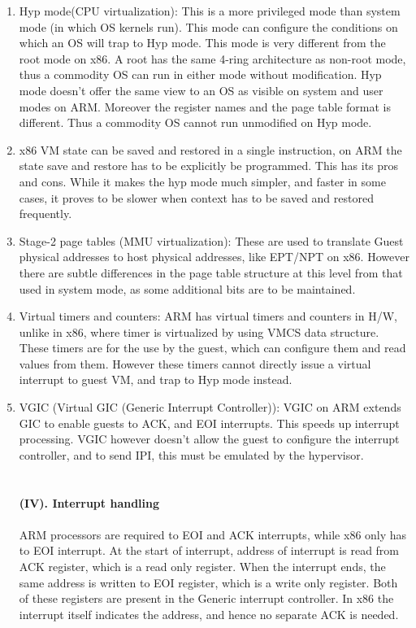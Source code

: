\documentclass[seminar,twoside]{iitbreport}
\begin{document}
\begin{enumerate}
\item Hyp mode(CPU virtualization): This is a more privileged mode than system mode (in which OS kernels run). This mode can configure the conditions on which an OS will trap to Hyp mode. This mode is very different from the root mode on x86. A root has the same 4-ring architecture as non-root mode, thus a commodity OS can run in either mode without modification. Hyp mode doesn't offer the same view to an OS as visible on system and user modes on ARM. Moreover the register names and the page table format is different. Thus a commodity OS cannot run unmodified on Hyp mode.

\item x86 VM state can be saved and restored in a single instruction, on ARM the state save and restore has to be explicitly be programmed. This has its pros and cons. While it makes the hyp mode much simpler, and faster in some cases, it proves to be slower when context has to be saved and restored frequently.

\item Stage-2 page tables (MMU virtualization): These are used to translate Guest physical addresses to host physical addresses, like EPT/NPT on x86. However there are subtle differences in the page table structure at this level from that used in system mode, as some additional bits are to be maintained.

\item Virtual timers and counters: ARM has virtual timers and counters in H/W, unlike in x86, where timer is virtualized by using VMCS data structure. These timers are for the use by the guest, which can configure them and read values from them. However these timers cannot directly issue a virtual interrupt to guest VM, and trap to Hyp mode instead.

\item VGIC (Virtual GIC (Generic Interrupt Controller)): VGIC on ARM extends GIC to enable guests to ACK, and EOI interrupts. This speeds up interrupt processing. VGIC however doesn't allow the guest to configure the interrupt controller, and to send IPI, this must be emulated by the hypervisor.
\\\\\\

\textbf{(IV). Interrupt handling}
\\\\
ARM processors are required to EOI and ACK interrupts, while x86 only has to EOI interrupt. At the start of interrupt, address of interrupt is read from ACK register, which is a read only register. When the interrupt ends, the same address is written to EOI register, which is a write only register. Both of these registers are present in the Generic interrupt controller. In x86 the interrupt itself indicates the address, and hence no separate ACK is needed.
\end{enumerate}
\end{document}
